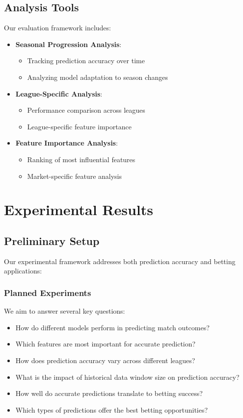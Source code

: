 \documentclass[conference]{IEEEtran}
\begin{document}
\subsection{Analysis Tools}
Our evaluation framework includes:
\begin{itemize}
\item \textbf{Seasonal Progression Analysis}:
    \begin{itemize}
    \item Tracking prediction accuracy over time
    \item Analyzing model adaptation to season changes
    \end{itemize}
\item \textbf{League-Specific Analysis}:
    \begin{itemize}
    \item Performance comparison across leagues
    \item League-specific feature importance
    \end{itemize}
\item \textbf{Feature Importance Analysis}:
    \begin{itemize}
    \item Ranking of most influential features
    \item Market-specific feature analysis
    \end{itemize}
\end{itemize}

\section{Experimental Results}
\subsection{Preliminary Setup}
Our experimental framework addresses both prediction accuracy and betting applications:

\subsubsection{Planned Experiments}
We aim to answer several key questions:
\begin{itemize}
\item How do different models perform in predicting match outcomes?
\item Which features are most important for accurate prediction?
\item How does prediction accuracy vary across different leagues?
\item What is the impact of historical data window size on prediction accuracy?
\item How well do accurate predictions translate to betting success?
\item Which types of predictions offer the best betting opportunities?
\end{itemize}
\end{document}

